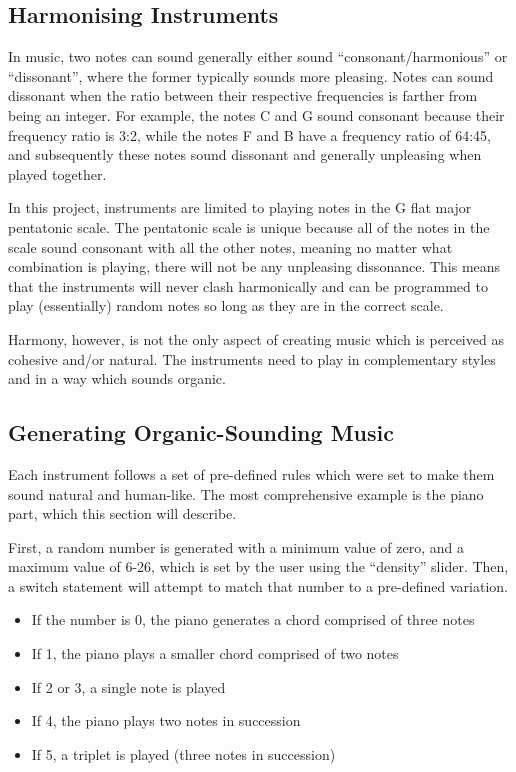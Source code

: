 \subsection{Harmonising Instruments}
In music, two notes can sound generally either sound “consonant/harmonious” or “dissonant”, where the former typically sounds more pleasing. Notes can sound dissonant when the ratio between their respective frequencies is farther from being an integer. For example, the notes C and G sound consonant because their frequency ratio is 3:2, while the notes F and B have a frequency ratio of 64:45, and subsequently these notes sound dissonant and generally unpleasing when played together.

In this project, instruments are limited to playing notes in the G flat major pentatonic scale. The pentatonic scale is unique because all of the notes in the scale sound consonant with all the other notes, meaning no matter what combination is playing, there will not be any unpleasing dissonance. This means that the instruments will never clash harmonically and can be programmed to play (essentially) random notes so long as they are in the correct scale.

Harmony, however, is not the only aspect of creating music which is perceived as cohesive and/or natural. The instruments need to play in complementary styles and in a way which sounds organic.

\subsection{Generating Organic-Sounding Music}
Each instrument follows a set of pre-defined rules which were set to make them sound natural and human-like. The most comprehensive example is the piano part, which this section will describe.

First, a random number is generated with a minimum value of zero, and a maximum value of 6-26, which is set by the user using the “density” slider. Then, a switch statement will attempt to match that number to a pre-defined variation.

\begin{itemize}
    \item If the number is 0, the piano generates a chord comprised of three notes
    \item If 1, the piano plays a smaller chord comprised of two notes
    \item If 2 or 3, a single note is played
    \item If 4, the piano plays two notes in succession
    \item If 5, a triplet is played (three notes in succession)
\end{itemize}

